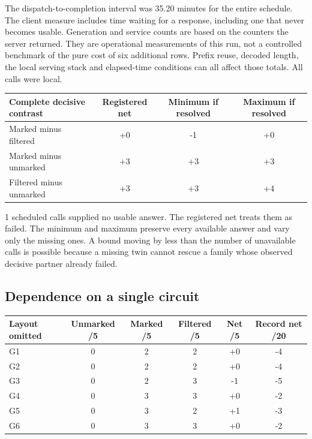 \documentclass[12pt,letterpaper]{article}
\begin{document}
The dispatch-to-completion interval was 35.20 minutes for the entire schedule. The client measure includes time waiting for a response, including one that never becomes usable. Generation and service counts are based on the counters the server returned. They are operational measurements of this run, not a controlled benchmark of the pure cost of six additional rows. Prefix reuse, decoded length, the local serving stack and elapsed-time conditions can all affect those totals. All calls were local.

\begin{center}{\footnotesize\setlength{\tabcolsep}{4pt}\begin{tabularx}{\linewidth}{@{}Yccc@{}}\toprule
Complete decisive contrast & Registered net & Minimum if resolved & Maximum if resolved\\ \midrule
Marked minus filtered & +0 & -1 & +0\\
Marked minus unmarked & +3 & +3 & +3\\
Filtered minus unmarked & +3 & +3 & +4\\\bottomrule\end{tabularx}}\end{center}

1 scheduled calls supplied no usable answer. The registered net treats them as failed. The minimum and maximum preserve every available answer and vary only the missing ones. A bound moving by less than the number of unavailable calls is possible because a missing twin cannot rescue a family whose observed decisive partner already failed.

\subsection{Dependence on a single circuit}

\begin{center}{\footnotesize\setlength{\tabcolsep}{4pt}\begin{tabularx}{\linewidth}{@{}Yccccc@{}}\toprule
Layout omitted & Unmarked /5 & Marked /5 & Filtered /5 & Net /5 & Record net /20\\ \midrule
G1 & 0 & 2 & 2 & +0 & -4\\
G2 & 0 & 2 & 2 & +0 & -4\\
G3 & 0 & 2 & 3 & -1 & -5\\
G4 & 0 & 3 & 3 & +0 & -2\\
G5 & 0 & 3 & 2 & +1 & -3\\
G6 & 0 & 3 & 3 & +0 & -2\\\bottomrule\end{tabularx}}\end{center}
\end{document}
